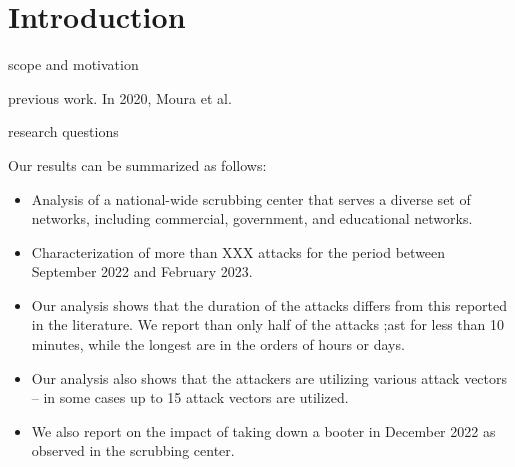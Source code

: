 \section{Introduction}\label{sec:intro}

scope and motivation

previous work.
In 2020, Moura et al.~\cite{Moura-scrubbing}

research questions

Our results can be summarized as follows:

\begin{itemize}

\item Analysis of a national-wide scrubbing center that serves a diverse set of networks, including commercial, government, and educational networks. %

\item Characterization of more than XXX attacks for the period between September 2022 and February 2023. 

\item Our analysis shows that the duration of the attacks differs from this reported in the literature. 
We report than only half of the attacks ;ast for less than 10 minutes, while the longest are in the orders of hours or days.

\item Our analysis also shows that the attackers are utilizing various attack vectors -- in some cases up to 15 attack vectors are utilized. 

\item We also report on the impact of taking down a booter in December 2022 as observed in the scrubbing center. 


%

\end{itemize}

